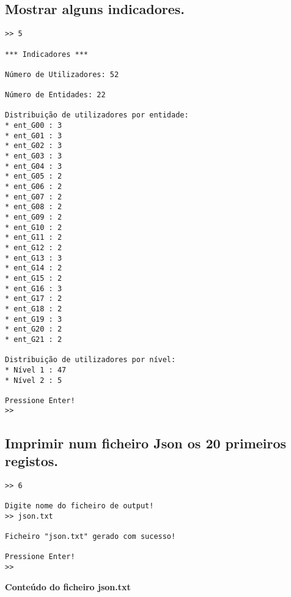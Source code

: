 \documentclass[11pt,a4paper]{report}%
\begin{document}
\subsection{Mostrar alguns indicadores.}

\begin{verbatim}
>> 5

*** Indicadores ***

Número de Utilizadores: 52

Número de Entidades: 22

Distribuição de utilizadores por entidade:
* ent_G00 : 3
* ent_G01 : 3
* ent_G02 : 3
* ent_G03 : 3
* ent_G04 : 3
* ent_G05 : 2
* ent_G06 : 2
* ent_G07 : 2
* ent_G08 : 2
* ent_G09 : 2
* ent_G10 : 2
* ent_G11 : 2
* ent_G12 : 2
* ent_G13 : 3
* ent_G14 : 2
* ent_G15 : 2
* ent_G16 : 3
* ent_G17 : 2
* ent_G18 : 2
* ent_G19 : 3
* ent_G20 : 2
* ent_G21 : 2

Distribuição de utilizadores por nível:
* Nível 1 : 47
* Nível 2 : 5

Pressione Enter!
>>
\end{verbatim}



\subsection{Imprimir num ficheiro Json os 20 primeiros registos.}

\begin{verbatim}
>> 6   

Digite nome do ficheiro de output!
>> json.txt

Ficheiro "json.txt" gerado com sucesso!

Pressione Enter!
>> 
\end{verbatim}

\textbf{Conteúdo do ficheiro json.txt}
\end{document}
